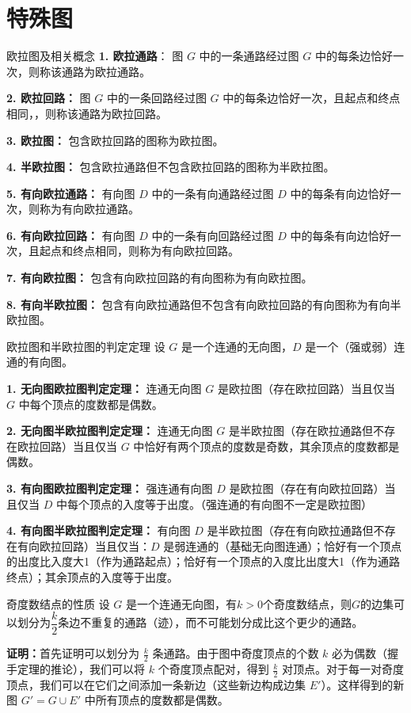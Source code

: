 \documentclass[lang=cn,11pt]{elegantbook}
\begin{document}
\section{特殊图}
\begin{definition}{欧拉图及相关概念}
\textbf{1. 欧拉通路}：
图 $G$ 中的一条通路经过图 $G$ 中的每条边恰好一次，则称该通路为欧拉通路。

\textbf{2. 欧拉回路：}
图 $G$ 中的一条回路经过图 $G$ 中的每条边恰好一次，且起点和终点相同，，则称该通路为欧拉回路。

\textbf{3. 欧拉图：}
包含欧拉回路的图称为欧拉图。

\textbf{4. 半欧拉图：}
包含欧拉通路但不包含欧拉回路的图称为半欧拉图。

\textbf{5. 有向欧拉通路：}
有向图 $D$ 中的一条有向通路经过图 $D$ 中的每条有向边恰好一次，则称为有向欧拉通路。

\textbf{6. 有向欧拉回路：}
有向图 $D$ 中的一条有向回路经过图 $D$ 中的每条有向边恰好一次，且起点和终点相同，则称为有向欧拉回路。

\textbf{7. 有向欧拉图：}
包含有向欧拉回路的有向图称为有向欧拉图。

\textbf{8. 有向半欧拉图：}
包含有向欧拉通路但不包含有向欧拉回路的有向图称为有向半欧拉图。
\end{definition}
\begin{theorem}{欧拉图和半欧拉图的判定定理}
设 $G$ 是一个连通的无向图，$D$ 是一个（强或弱）连通的有向图。

\textbf{1. 无向图欧拉图判定定理：}
连通无向图 $G$ 是欧拉图（存在欧拉回路）当且仅当 $G$ 中每个顶点的度数都是偶数。

\textbf{2. 无向图半欧拉图判定定理：}
连通无向图 $G$ 是半欧拉图（存在欧拉通路但不存在欧拉回路）当且仅当 $G$ 中恰好有两个顶点的度数是奇数，其余顶点的度数都是偶数。

\textbf{3. 有向图欧拉图判定定理：}
强连通有向图 $D$ 是欧拉图（存在有向欧拉回路）当且仅当 $D$ 中每个顶点的入度等于出度。（强连通的有向图不一定是欧拉图）

\textbf{4. 有向图半欧拉图判定定理：}
有向图 $D$ 是半欧拉图（存在有向欧拉通路但不存在有向欧拉回路）当且仅当：$D$ 是弱连通的（基础无向图连通）；恰好有一个顶点的出度比入度大1（作为通路起点）；恰好有一个顶点的入度比出度大1（作为通路终点）；其余顶点的入度等于出度。
\end{theorem}
\begin{theorem}{奇度数结点的性质}
    设 $G$ 是一个连通无向图，有$k>0$个奇度数结点，则$G$的边集可以划分为$\dfrac{k}2$条边不重复的通路（迹），而不可能划分成比这个更少的通路。
\end{theorem}
\textbf{证明：}首先证明可以划分为 $\frac{k}{2}$ 条通路。由于图中奇度顶点的个数 $k$ 必为偶数（握手定理的推论），我们可以将 $k$ 个奇度顶点配对，得到 $\frac{k}{2}$ 对顶点。对于每一对奇度顶点，我们可以在它们之间添加一条新边（这些新边构成边集 $E'$）。这样得到的新图 $G' = G \cup E'$ 中所有顶点的度数都是偶数。
\end{document}
